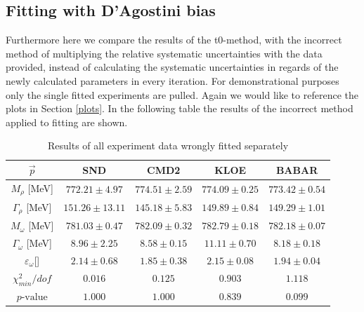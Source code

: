 \documentclass[a4paper]{article}
\begin{document}
\newpage
\subsection{Fitting with D'Agostini bias}
Furthermore here we compare the results of the t0-method, with the incorrect method of
multiplying the relative systematic uncertainties with the data provided, instead of
calculating the systematic uncertainties in regards of the newly calculated parameters in
every iteration. For demonstrational purposes only the single fitted experiments are pulled.
Again we would like to reference the plots in Section \ref{plots}. In the following table
the results of the incorrect method applied to fitting are shown.

\begin{table}[H]
    \caption{Results of all experiment data wrongly fitted  separately\label{tabwrong}}
    \centering
    \begin{tabular}{|c|c|c|c|c|}
        \hline
        $\vec{p}$ & SND & CMD2 & KLOE & BABAR \\ \hline
        $M_{\rho}$   [MeV]           & $772.21	\pm 4.97$ & $774.51	\pm 2.59$ &$774.09	\pm 0.25 $&$773.42 \pm 0.54$ \\
        $\Gamma_{\rho}$   [MeV]      & $151.26	\pm 13.11$ & $145.18	\pm 5.83$ &$149.89	\pm 0.84 $&$149.29	\pm 1.01$\\
        $M_{\omega}$      [MeV]      & $781.03	\pm 0.47$ & $782.09	\pm 0.32$ &$782.79	\pm 0.18 $&$782.18	\pm 0.07$\\
        $\Gamma_{\omega}$  [MeV]     & $8.96	\pm 2.25    $ & $8.58	\pm 0.15$ &$11.11	\pm 0.70 $&$8.18	\pm 0.18$\\
        $\varepsilon_{\omega}$[]  & $2.14	\pm 0.68    $ & $1.85	\pm 0.38$ &$2.15	\pm 0.08 $&$1.94	\pm 0.04$\\
        \hline \hline
        $\chi^2_{min}/dof$      & $0.016$&$ 0.125$&$ 0.903$&$ 1.118$\\
        $p\text{-value}$        & $1.000$&$ 1.000$&$ 0.839$&$ 0.099$\\
        \hline
    \end{tabular}
\end{table}
\end{document}
